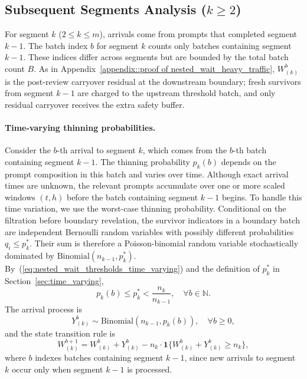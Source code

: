 \subsection{Subsequent Segments Analysis ($k \geq 2$)}

For segment $k$ ($2\leq k\leq m$), arrivals come from prompts that completed segment $k-1$. The batch index $b$ for segment $k$ counts only batches containing segment $k-1$. These indices differ across segments but are bounded by the total batch count $B$. As in Appendix~\ref{appendix::proof of nested_wait_heavy_traffic}, \(W^b_{(k)}\) is the post-review carryover residual at the downstream boundary; fresh survivors from segment \(k-1\) are charged to the upstream threshold batch, and only residual carryover receives the extra safety buffer.

\paragraph{Time-varying thinning probabilities.} Consider the $b$-th arrival to segment $k$, which comes from the $b$-th batch containing segment $k-1$. The thinning probability $p_k(b)$ depends on the prompt composition in this batch and varies over time. Although exact arrival times are unknown, the relevant prompts accumulate over one or more scaled windows \((t,h)\) before the batch containing segment \(k-1\) begins. To handle this time variation, we use the worst-case thinning probability. Conditional on the filtration before boundary revelation, the survivor indicators in a boundary batch are independent Bernoulli random variables with possibly different probabilities \(q_i\le p_k^*\). Their sum is therefore a Poisson-binomial random variable stochastically dominated by \(\mathrm{Binomial}(n_{k-1},p_k^*)\). By~(\ref{eq:nested_wait_thresholds_time_varying}) and the definition of \(p_k^*\) in Section~\ref{sec:time_varying},
$$p_k(b) \leq p_k^* < \frac{n_k}{n_{k-1}}, \quad \forall b \in \mathbb{N}.$$
The arrival process is
$$Y_{(k)}^b \sim \text{Binomial}(n_{k-1},p_k(b)),\quad \forall b\geq 0,$$
and the state transition rule is
$$W_{(k)}^{b+1} = W_{(k)}^{b} + Y_{(k)}^{b} - n_k \cdot\mathbf{1}\{ W_{(k)}^{b} + Y_{(k)}^{b}\geq n_k \}, $$
where $b$ indexes batches containing segment $k-1$, since new arrivals to segment $k$ occur only when segment $k-1$ is processed.

